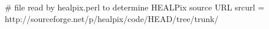 # file read by healpix.perl to determine HEALPix source URL
srcurl = http://sourceforge.net/p/healpix/code/HEAD/tree/trunk/






